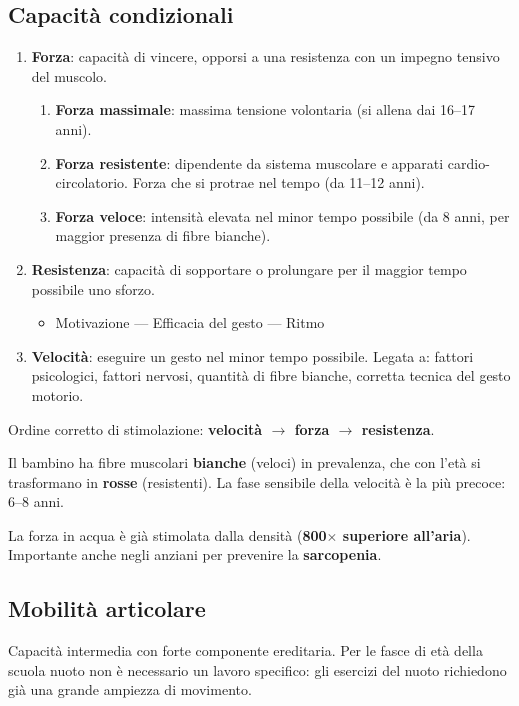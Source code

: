 \documentclass[12pt, a4paper]{article}
\begin{document}
\subsection{Capacità condizionali}

\begin{enumerate}
  \item \textbf{Forza}: capacità di vincere, opporsi a una resistenza con un impegno tensivo del muscolo.
  \begin{enumerate}
    \item \textbf{Forza massimale}: massima tensione volontaria (si allena dai 16--17 anni).
    \item \textbf{Forza resistente}: dipendente da sistema muscolare e apparati cardio-circolatorio. Forza che si protrae nel tempo (da 11--12 anni).
    \item \textbf{Forza veloce}: intensità elevata nel minor tempo possibile (da 8 anni, per maggior presenza di fibre bianche).
  \end{enumerate}
  \item \textbf{Resistenza}: capacità di sopportare o prolungare per il maggior tempo possibile uno sforzo.
  \begin{itemize}
    \item Motivazione --- Efficacia del gesto --- Ritmo
  \end{itemize}
  \item \textbf{Velocità}: eseguire un gesto nel minor tempo possibile. Legata a: fattori psicologici, fattori nervosi, quantità di fibre bianche, corretta tecnica del gesto motorio.
\end{enumerate}

Ordine corretto di stimolazione: \textbf{velocità $\rightarrow$ forza $\rightarrow$ resistenza}.

Il bambino ha fibre muscolari \textbf{bianche} (veloci) in prevalenza, che con l'età si trasformano in \textbf{rosse} (resistenti). La fase sensibile della velocità è la più precoce: 6--8 anni.

La forza in acqua è già stimolata dalla densità (\textbf{800$\times$ superiore all'aria}). Importante anche negli anziani per prevenire la \textbf{sarcopenia}.

\subsection{Mobilità articolare}

Capacità intermedia con forte componente ereditaria. Per le fasce di età della scuola nuoto non è necessario un lavoro specifico: gli esercizi del nuoto richiedono già una grande ampiezza di movimento.
\end{document}
